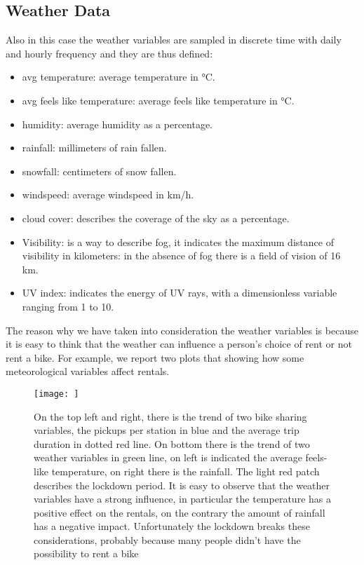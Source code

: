 \subsection{Weather Data}
Also in this case the weather variables are sampled in discrete time with daily and hourly frequency and they are thus defined:
\begin{itemize}
	\item avg temperature: average temperature in °C.
	\item avg feels like temperature: average feels like temperature in °C.
	\item humidity: average humidity as a percentage.
	\item rainfall: millimeters of rain fallen.
	\item snowfall: centimeters of snow fallen.
	\item windspeed: average windspeed in km/h.
	\item cloud cover: describes the coverage of the sky as a percentage.
	\item Visibility: is a way to describe fog, it indicates the maximum distance of visibility in kilometers: in the absence of fog there is a field of vision of 16 km.
	\item UV index: indicates the energy of UV rays, with a dimensionless variable ranging from 1 to 10.
\end{itemize}
The reason why we have taken into consideration the weather variables is because it is easy to think that the weather can influence a person's choice of rent or not rent a bike. For example, we report two plots that showing how some meteorological variables affect rentals. 
\begin{figure}[h!] 
	\begin{center} 
		\texttt{[image: ]}\\ 
		\caption{On the top left and right, there is the trend of two bike sharing variables, the pickups per station in blue and the average trip duration in dotted red line. On bottom there is the trend of two weather variables in green line, on left is indicated the average feels-like temperature, on right there is the rainfall. The light red patch describes the lockdown period. It is easy to observe that the weather variables have a strong influence, in particular the temperature has a positive effect on the rentals, on the contrary the amount of rainfall has a negative impact. Unfortunately the lockdown breaks these considerations, probably because many people didn't have the possibility to rent a bike} 
	\end{center} 
\end{figure}
